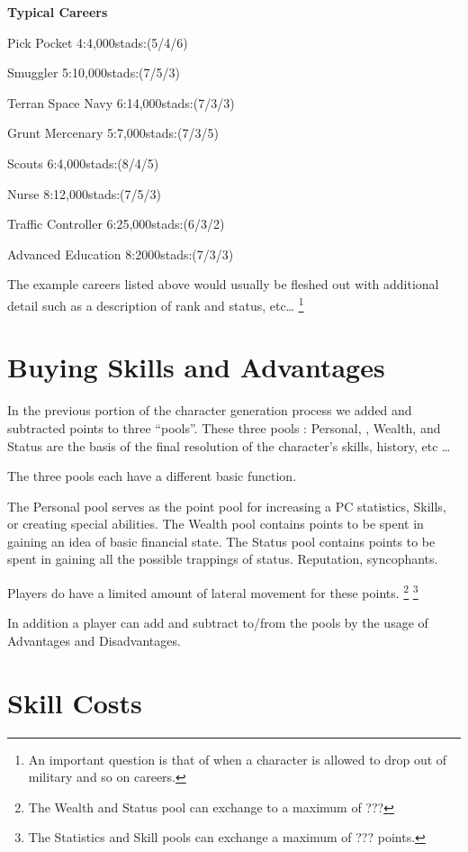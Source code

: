 {\bf Typical Careers}
	\begin{relate}
		\item[Pick Pocket]
        4:4,000stads:(5/4/6)
		\item[Smuggler]
        5:10,000stads:(7/5/3)
		\item[Terran Space Navy]
        6:14,000stads:(7/3/3)
		\item[Grunt Mercenary]
        5:7,000stads:(7/3/5)
		\item[Scouts]
        6:4,000stads:(8/4/5)
		\item[Nurse]
        8:12,000stads:(7/5/3)
		\item[Traffic Controller]
        6:25,000stads:(6/3/2)
		\item[Advanced Education]
        8:2000stads:(7/3/3)
	\end{relate}

The example careers listed above would usually be fleshed out with
additional detail such as a description of rank and status, etc\dots
\footnote{An important question is that of when a character is
allowed to drop out of military and so on careers.}

\section{Buying Skills and Advantages}

In the previous portion of the character generation process we added
and subtracted points to three ``pools''. These three pools : Personal,
, Wealth, and Status are the basis of the final resolution of
the character's skills, history, etc \dots

The three pools each have a different basic function.

The Personal pool serves as the point pool for
increasing a PC statistics, Skills,  or creating special abilities.
The Wealth pool contains points to be spent in gaining an idea of
basic financial state.
The Status pool contains points to be spent in gaining all the
possible trappings of status. Reputation, syncophants.

Players do have a limited amount of lateral movement for these
points. \footnote{The Wealth and Status pool can exchange to a maximum of ???}
\footnote{The Statistics and Skill pools can exchange a maximum of ??? points.}

In addition a player can add and subtract to/from the pools by the
usage of Advantages and Disadvantages.

\section{Skill Costs}

